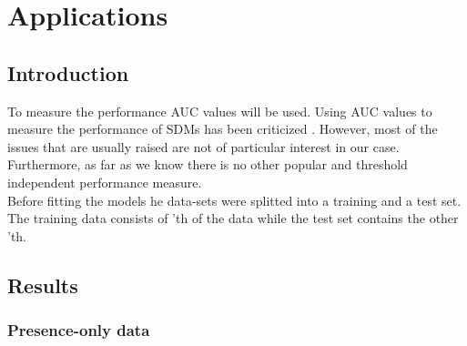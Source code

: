 \chapter{Applications}
\label{ch:Applications}
\section{Introduction}
To measure the performance AUC values will be used. Using AUC values to measure the performance of SDMs has been criticized \parencite{lobo_auc:_2008, jimenez-valverde_insights_2012}. However, most of the issues that are usually raised are not of particular interest in our case. Furthermore, as far as we know there is no other popular and threshold independent performance measure. \\

Before fitting the models he data-sets were splitted into a training and a test set. The training data consists of 'th of the data while the test set contains the other 'th.\\

\section{Results}
\subsection{Presence-only data}

